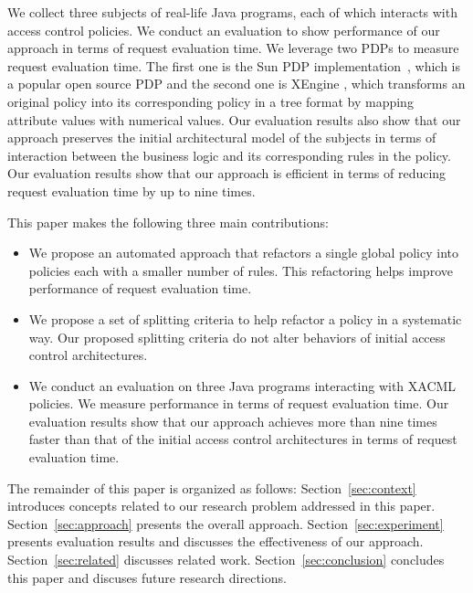 
We collect three subjects of real-life Java programs, each of which interacts
with access control policies. 
We conduct an evaluation to show performance of our approach in terms of request evaluation time.
We leverage two PDPs to measure request evaluation time. The first one is the
Sun PDP implementation~\cite{oasis}, which is a popular open source PDP and the second one is 
XEngine \cite{Xengine}, which transforms an original policy
into its corresponding policy in a tree format by mapping attribute values with numerical values.
Our evaluation results also show that our approach
preserves the initial architectural model of the subjects in terms of interaction between the business logic and its corresponding
rules in the policy. Our evaluation results show that our approach
is efficient in terms of reducing request evaluation time by up to nine times. 



This paper makes the following three main contributions:
\begin{itemize}
\item We propose an automated approach that refactors a single global policy into policies each with a smaller number of rules. This
refactoring helps improve performance of request evaluation time.
\item We propose a set of splitting criteria to help refactor a policy in a systematic way. Our proposed splitting criteria do not alter behaviors of initial access control architectures.
\item We conduct an evaluation on three Java programs interacting with XACML policies. We measure performance in terms
of request evaluation time. 
Our evaluation results show that our approach achieves more than nine times faster than that of the initial access control architectures in terms of request evaluation time.
\end{itemize}


The remainder of this paper is organized as follows: Section~\ref{sec:context} introduces concepts related to our research problem addressed in this paper.
Section~\ref{sec:approach} presents the overall approach. 
Section~\ref{sec:experiment} presents evaluation results and discusses the effectiveness of our approach. Section~\ref{sec:related} discusses related work.
Section~\ref{sec:conclusion} concludes this paper and discuses future research directions.
